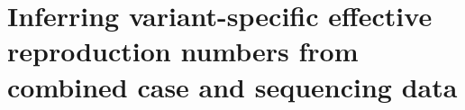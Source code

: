 
\chapter{Inferring variant-specific effective reproduction numbers from combined case and sequencing data}
